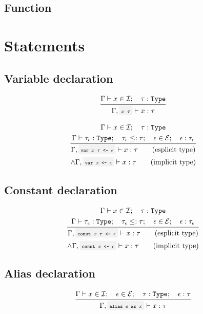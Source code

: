 
\subsection{Function}


\clearpage

\section{Statements}

\subsection{Variable declaration}

\[
	\infrule{
		\EnvSym\then x \in \Id \semiq \tau:\Type
	}{
		\EnvSym, \code{$x$ $\tau$} \then x:\tau
	}
\]

\[
	\infrule{
		\EnvSym\then x\in\Id \semiq \tau:\Type \\*
		\EnvSym\then \tau_\expr:\Type \semiq \tau_\expr\narreq\tau \semiq \expr\in\Expr \semiq \expr:\tau_\expr
	}{
		\EnvSym, \code{var $x$ $\tau$ <- $\expr$} \then x:\tau \qquad \text{(esplicit type)} \\*
		\land \EnvSym, \code{var $x$ <- $\expr$} \then x:\tau \qquad \text{(implicit type)}
	}
\]


\subsection{Constant declaration}

\[
	\infrule{
		\EnvSym\then x\in\Id \semiq \tau:\Type \\*
		\EnvSym\then \tau_\expr:\Type \semiq \tau_\expr\narreq\tau \semiq \expr\in\Expr \semiq \expr:\tau_\expr
	}{
		\EnvSym, \code{const $x$ $\tau$ <- $\expr$} \then x:\tau \qquad \text{(esplicit type)} \\*
		\land \EnvSym, \code{const $x$ <- $\expr$} \then x:\tau \qquad \text{(implicit type)}
	}
\]

\subsection{Alias declaration}

\[
	\infrule{
		\EnvSym\then x \in \Id \semiq \expr \in \Expr \semiq \tau:\Type \semiq \expr:\tau
	}{
		\EnvSym, \code{alias $e$ as $x$} \then x:\tau
	}
\]

